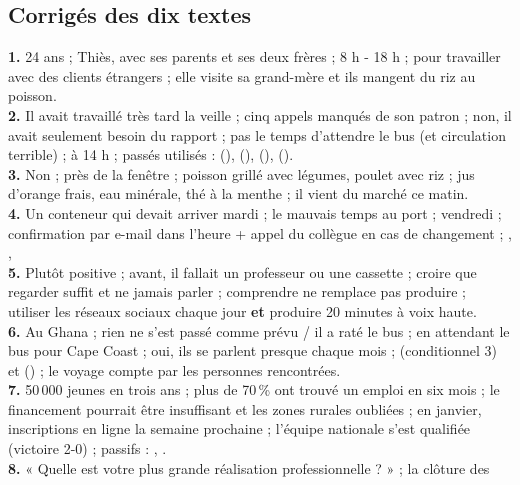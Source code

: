 \subsection{Corrigés des dix textes}
\begin{corrige}
\textbf{1.} 24 ans ; Thiès, avec ses parents et ses deux frères ; 8 h - 18 h ;
pour travailler avec des clients étrangers ; elle visite sa grand-mère et ils mangent du
riz au poisson.\\
\textbf{2.} Il avait travaillé très tard la veille ; cinq appels manqués de son patron ;
non, il avait seulement besoin du rapport ; pas le temps d'attendre le bus (et circulation
terrible) ; à 14 h ; passés utilisés :  (),
 (),  (),
 ().\\
\textbf{3.} Non ; près de la fenêtre ; poisson grillé avec légumes, poulet avec riz ;
jus d'orange frais, eau minérale, thé à la menthe ; il vient du marché ce matin.\\
\textbf{4.} Un conteneur qui devait arriver mardi ; le mauvais temps au port ; vendredi ;
confirmation par e-mail dans l'heure + appel du collègue en cas de changement ;
, ,
\\
\textbf{5.} Plutôt positive ; avant, il fallait un professeur ou une cassette ;
croire que regarder suffit et ne jamais parler ; comprendre ne remplace pas produire ;
utiliser les réseaux sociaux chaque jour \textbf{et} produire 20 minutes à voix haute.\\
\textbf{6.} Au Ghana ; rien ne s'est passé comme prévu / il a raté le bus ; en attendant le
bus pour Cape Coast ; oui, ils se parlent presque chaque mois ;
 (conditionnel 3) et
 () ;
le voyage compte par les personnes rencontrées.\\
\textbf{7.} 50\,000 jeunes en trois ans ; plus de 70\,\% ont trouvé un emploi en six mois ;
le financement pourrait être insuffisant et les zones rurales oubliées ; en janvier,
inscriptions en ligne la semaine prochaine ; l'équipe nationale s'est qualifiée
(victoire 2-0) ; passifs : , .\\
\textbf{8.} « Quelle est votre plus grande réalisation professionnelle ? » ; la clôture des

\end{corrige}
